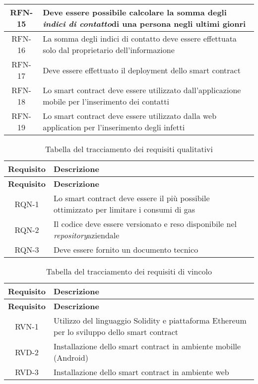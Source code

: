 \begin{center}
\begin{longtable}{| c | p{30em} |}
			\hline
			RFN-15   & Deve essere possibile calcolare la somma degli \emph{\gls{indici di contatto}}\glsfirstoccur di una persona negli ultimi gionri\\
			\hline
			RFN-16   & La somma degli indici di contatto deve essere effettuata solo dal proprietario dell'informazione \\
			\hline
			RFN-17   & Deve essere effettuato il deployment dello smart contract \\ 
			\hline
			RFN-18   & Lo smart contract deve essere utilizzato dall'applicazione mobile per l'inserimento dei contatti\\ 
			\hline
			RFN-19   & Lo smart contract deve essere utilizzato dalla web application per l'inserimento degli infetti \\ 
 			\hline
					

		\end{longtable}
	\end{center}

\begin{center}
	\begin{longtable}{| c | p{30em} |}
		\caption{Tabella del tracciamento dei requisiti qualitativi}
		\label{tab:requisiti-qualitativi}\\
		\hline
		\textbf{Requisito} & \centering\textbf{Descrizione}\\
		\endfirsthead
		\hline
		\textbf{Requisito} & \centering\textbf{Descrizione}\\
		\endhead
		\endfoot
		
		\hline
		RQN-1    & Lo smart contract deve essere il più possibile ottimizzato per limitare i consumi di gas \\
		\hline
		RQN-2    & Il codice deve essere versionato e reso disponibile nel \emph{\gls{repository}}\glsfirstoccur aziendale \\
		\hline
		RQN-3    & Deve essere fornito un documento tecnico \\
		\hline
	

	\end{longtable}
\end{center}

\begin{center}
	\begin{longtable}{| c | p{30em} |}
		\caption{Tabella del tracciamento dei requisiti di vincolo}
		\label{tab:requisiti-vincolo}\\
		\hline
		\textbf{Requisito} & \centering\textbf{Descrizione}\\
		\endfirsthead
		\hline
		\textbf{Requisito} & \centering\textbf{Descrizione}\\
		\endhead
		\endfoot
		
		\hline
		RVN-1    & Utilizzo del linguaggio Solidity e piattaforma Ethereum per lo sviluppo dello smart contract  \\
		\hline
		RVD-2    & Installazione dello smart contract in ambiente mobille (Android) \\
		\hline
		RVD-3    & Installazione dello smart contract in ambiente web \\
		\hline			
	\end{longtable}
\end{center}
